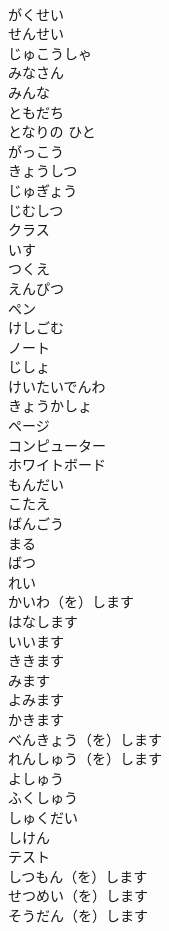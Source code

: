 \documentclass[8pt]{extreport}
\begin{document}
\begin{CJK}{UTF8}{min}
\\	がくせい	
\\	せんせい	
\\	じゅこうしゃ	
\\	みなさん	
\\	みんな	
\\	ともだち	
\\	となりの ひと	
\\	がっこう	
\\	きょうしつ	
\\	じゅぎょう	
\\	じむしつ	
\\	クラス	
\\	いす	
\\	つくえ	
\\	えんぴつ	
\\	ペン	
\\	けしごむ	
\\	ノート	
\\	じしょ	
\\	けいたいでんわ	
\\	きょうかしょ	
\\	ページ	
\\	コンピューター	
\\	ホワイトボード	
\\	もんだい	
\\	こたえ	
\\	ばんごう	
\\	まる	
\\	ばつ	
\\	れい	
\\	かいわ（を）します	
\\	はなします	
\\	いいます	
\\	ききます	
\\	みます	
\\	よみます	
\\	かきます	
\\	べんきょう（を）します	
\\	れんしゅう（を）します	
\\	よしゅう	
\\	ふくしゅう	
\\	しゅくだい	
\\	しけん	
\\	テスト	
\\	しつもん（を）します	
\\	せつめい（を）します	
\\	そうだん（を）します	

\end{CJK}
\end{document}
